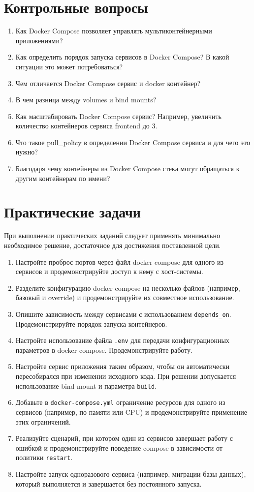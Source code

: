 \documentclass[12pt,a4paper]{article}
\begin{document}
\section{Контрольные вопросы}
\begin{enumerate}
    \item Как Docker Compose позволяет управлять мультиконтейнерными приложениями?
    \item Как определить порядок запуска сервисов в Docker Compose? В какой ситуации это может потребоваться?
    \item Чем отличается Docker Compose сервис и docker контейнер?
    \item В чем разница между volumes и bind mounts?
    \item Как масштабировать Docker Compose сервис? Например, увеличить количество контейнеров сервиса frontend до 3.
    \item Что такое pull\_policy в определении Docker Compose сервиса и для чего это нужно?
    \item Благодаря чему контейнеры из Docker Compose стека могут обращаться к другим контейнерам по имени?
\end{enumerate}

\section{Практические задачи}
При выполнении практических заданий следует применять минимально необходимое решение, достаточное для достижения поставленной цели.
\begin{enumerate}
    \item Настройте проброс портов через файл docker compose для одного из сервисов и продемонстрируйте доступ к нему с хост-системы.
    \item Разделите конфигурацию docker compose на несколько файлов (например, базовый и override) и продемонстрируйте их совместное использование.
    \item Опишите зависимость между сервисами с использованием \texttt{depends\_on}. Продемонстрируйте порядок запуска контейнеров.
    \item Настройте использование файла \texttt{.env} для передачи конфигурационных параметров в docker compose. Продемонстрируйте работу.
    \item Настройте сервис приложения таким образом, чтобы он автоматически пересобирался при изменении исходного кода. При решении допускается использование bind mount и параметра \texttt{build}.
    \item Добавьте в \texttt{docker-compose.yml} ограничение ресурсов для одного из сервисов (например, по памяти или CPU) и продемонстрируйте применение этих ограничений.
    \item Реализуйте сценарий, при котором один из сервисов завершает работу с ошибкой и продемонстрируйте поведение compose в зависимости от политики \texttt{restart}.
    \item Настройте запуск одноразового сервиса (например, миграции базы данных), который выполняется и завершается без постоянного запуска.
\end{enumerate}
\end{document}
